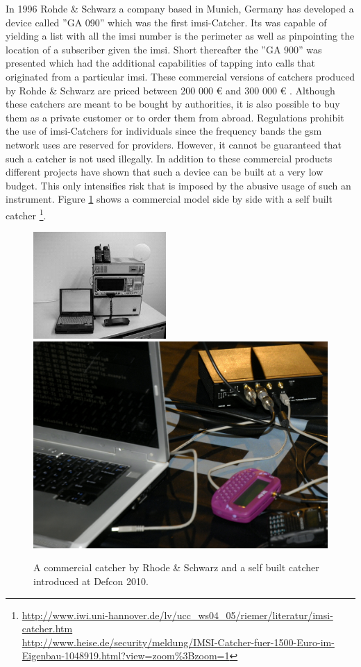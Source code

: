In 1996 Rohde \& Schwarz a company based in Munich, Germany has developed a device called ''GA 090'' which was the first \gls{imsi}-Catcher.
Its was capable of yielding a list with all the \gls{imsi} number is the perimeter as well as pinpointing the location of a subscriber given the \gls{imsi}.
Short thereafter the ''GA 900'' was presented which had the additional capabilities of tapping into calls that originated from a particular \gls{imsi}.
These commercial versions of catchers produced by Rohde \& Schwarz are priced between 200 000 \euro{} and 300 000 \euro{} \cite{fox}.
Although these catchers are meant to be bought by authorities, it is also possible to buy them as a private customer or to order them from abroad.
Regulations prohibit the use of \gls{imsi}-Catchers for individuals since the frequency bands the \gls{gsm}  network uses are reserved for providers.
However, it cannot be guaranteed that such a catcher is not used illegally.
In addition to these commercial products different projects \cite{dennis, def_catcher} have shown that such a device can be built at a very low budget.
This only intensifies risk that is imposed by the abusive usage of such an instrument.
Figure \ref{fig:catchers} shows a commercial model side by side with a self built catcher \footnote{\url{http://www.iwi.uni-hannover.de/lv/ucc\_ws04\_05/riemer/literatur/imsi-catcher.htm}\\\url{http://www.heise.de/security/meldung/IMSI-Catcher-fuer-1500-Euro-im-Eigenbau-1048919.html?view=zoom\%3Bzoom=1}}.
\begin{figure}
\centering
\includegraphics[width=0.45\textwidth]{../Images/imsi_catcher}\hspace{1cm}\includegraphics[width=.45\textwidth]{../Images/usrp}
\caption{A commercial catcher by Rhode \& Schwarz and a self built catcher introduced at Defcon 2010.}
\label{fig:catchers}
\end{figure}

